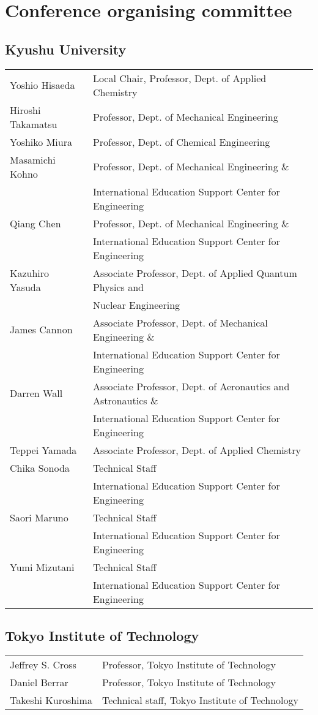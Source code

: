 \section{Conference organising committee}

\subsection*{Kyushu University}
\begin{tabular}{ll}
    Yoshio Hisaeda  & Local Chair, Professor, Dept. of Applied Chemistry \\
    Hiroshi Takamatsu & Professor, Dept. of Mechanical Engineering \\
    Yoshiko Miura   & Professor, Dept. of Chemical Engineering \\
    Masamichi Kohno & Professor, Dept. of Mechanical Engineering \& \\
                    & International Education Support Center for Engineering \\
    Qiang Chen      & Professor, Dept. of Mechanical Engineering \& \\
                    & International Education Support Center for Engineering \\
    Kazuhiro Yasuda & Associate Professor, Dept. of Applied Quantum Physics and\\
                    & Nuclear Engineering \\
    James Cannon    & Associate Professor, Dept. of Mechanical Engineering \& \\
                    & International Education Support Center for Engineering \\
    Darren Wall     & Associate Professor,  Dept. of Aeronautics and Astronautics \& \\
                    & International Education Support Center for Engineering \\
    Teppei Yamada   & Associate Professor, Dept. of Applied Chemistry \\
    Chika Sonoda    & Technical Staff \\ 
                    & International Education Support Center for Engineering \\
    Saori Maruno    & Technical Staff\\
                    & International Education Support Center for Engineering \\
    Yumi Mizutani   & Technical Staff\\
                    & International Education Support Center for Engineering \\
\end{tabular}

\subsection*{Tokyo Institute of Technology}

\begin{tabular}{ll}
    Jeffrey S. Cross & Professor, Tokyo Institute of Technology \\
    Daniel Berrar & Professor, Tokyo Institute of Technology \\
    Takeshi Kuroshima & Technical staff, Tokyo Institute of Technology \\
\end{tabular}

